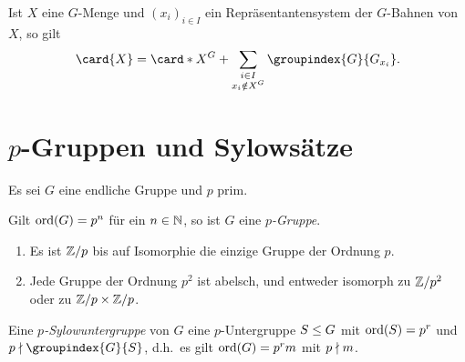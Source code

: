 \begin{corollary}[Bahnenformel]
  Ist $X$ eine $G$-Menge und $(x_i)_{i \in I}$ ein Repräsentantensystem der $G$-Bahnen von $X$, so gilt
  \[
      \card{X}
    =   \card*{X^G}
      + \sum_{\substack{i \in I \\ x_i \notin X^G}} \groupindex{G}{G_{x_i}}.
  \]
\end{corollary}










\pagebreak










\section{\texorpdfstring{$p$}{p}-Gruppen und Sylowsätze}

Es sei $G$ eine endliche Gruppe und $p$ prim.

\begin{definition}
  Gilt $\operatorname{ord}(G) = p^n$ für ein $n \in \mathbb{N}$, so ist $G$ eine \emph{$p$-Gruppe}.
\end{definition}

\begin{example}
  \begin{enumerate}
    \item
      Es ist $\mathbb{Z}/p$ bis auf Isomorphie die einzige Gruppe der Ordnung $p$.
    \item
      Jede Gruppe der Ordnung $p^2$ ist abelsch, und entweder isomorph zu $\mathbb{Z}/p^2$ oder zu $\mathbb{Z}/p \times \mathbb{Z}/p$.
  \end{enumerate}
\end{example}


\begin{definition}
  Eine \emph{$p$-Sylow\-unter\-gruppe} von $G$ eine $p$-Untergruppe $S \mathrel{\leq} G$ mit $\operatorname{ord}(S) = p^r$ und $p \notdivides \groupindex{G}{S}$, d.h.\ es gilt $\operatorname{ord}(G) = p^r m$ mit $p \mathrel{\nmid} m$.
\end{definition}

